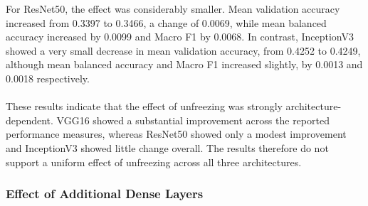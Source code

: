 \documentclass[12pt, a4paper]{report}
\let\oldsubsubsection\subsubsection
\renewcommand{\subsubsection}{%
    \Needspace{6\baselineskip}%
    \oldsubsubsection
}
\begin{document}
					For ResNet50, the effect was considerably smaller. Mean validation accuracy increased from 0.3397 to 0.3466, a change of 0.0069, while mean balanced accuracy increased by 0.0099 and Macro F1 by 0.0068. In contrast, InceptionV3 showed a very small decrease in mean validation accuracy, from 0.4252 to 0.4249, although mean balanced accuracy and Macro F1 increased slightly, by 0.0013 and 0.0018 respectively.\\\\
					These results indicate that the effect of unfreezing was strongly architecture-dependent. VGG16 showed a substantial improvement across the reported performance measures, whereas ResNet50 showed only a modest improvement and InceptionV3 showed little change overall. The results therefore do not support a uniform effect of unfreezing across all three architectures.
					
				\subsubsection{Effect of Additional Dense Layers}
					
\end{document}

